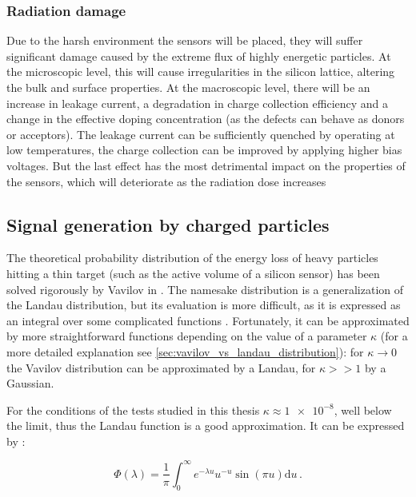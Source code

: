 \subsubsection{Radiation damage}

Due to the harsh environment the sensors will be placed, they will suffer significant damage caused by the extreme flux of highly energetic particles. At the microscopic level, this will cause irregularities in the silicon lattice, altering the bulk and surface properties. At the macroscopic level, there will be an increase in leakage current, a degradation in charge collection efficiency and a change in the effective doping concentration \cite{Moll:1999kv} (as the defects can behave as donors or acceptors). The leakage current can be sufficiently quenched by operating at low temperatures, the charge collection can be improved by applying higher bias voltages. But the last effect has the most detrimental impact on the properties of the sensors, which will deteriorate as the radiation dose increases


\subsection{Signal generation by charged particles}\label{subsec:charged_particles_distribution}
The theoretical probability distribution of the energy loss of heavy particles hitting a thin target (such as the active volume of a silicon sensor) has been solved rigorously by Vavilov in \cite{vavilov_1957}. The namesake distribution is a generalization of the Landau distribution, but its evaluation is more difficult, as it is expressed as an integral over some complicated functions \cite[Eq.(4)]{vavilov_1957}. Fortunately, it can be approximated by more straightforward functions depending on the value of a parameter \(\kappa\) (for a more detailed explanation see \ref{sec:vavilov_vs_landau_distribution}): for \(\kappa\rightarrow0\) the Vavilov distribution can be approximated by a Landau, for \(\kappa>>1\) by a Gaussian.

For the conditions of the tests studied in this thesis \(\kappa\approx \num{1e-8}\), well below the limit, thus the Landau function is a good approximation. It can be expressed by \cite{KOLBIG198497}:

\begin{equation}\label{eq:landau}
    \Phi (\lambda) = \frac{1}{\pi} \int_{0}^{\infty} e^{-\lambda u} u^{-u} \sin (\pi u ) \mathrm{d}u \, .
\end{equation}

